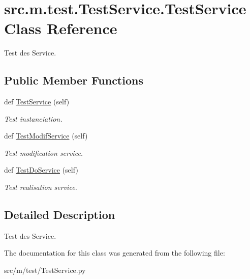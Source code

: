 \hypertarget{classsrc_1_1m_1_1test_1_1_test_service_1_1_test_service}{}\section{src.\+m.\+test.\+Test\+Service.\+Test\+Service Class Reference}
\label{classsrc_1_1m_1_1test_1_1_test_service_1_1_test_service}


Test des Service.  


\subsection*{Public Member Functions}
\begin{DoxyCompactItemize}
\item 
\hypertarget{classsrc_1_1m_1_1test_1_1_test_service_1_1_test_service_add84ee3b8efb0d31a2f31dae646a063f}{}def \hyperlink{classsrc_1_1m_1_1test_1_1_test_service_1_1_test_service_add84ee3b8efb0d31a2f31dae646a063f}{Test\+Service} (self)\label{classsrc_1_1m_1_1test_1_1_test_service_1_1_test_service_add84ee3b8efb0d31a2f31dae646a063f}

\begin{DoxyCompactList}\small\item\em Test instanciation. \end{DoxyCompactList}\item 
\hypertarget{classsrc_1_1m_1_1test_1_1_test_service_1_1_test_service_abd0da6c409b14d25eb39e0ac8d54985f}{}def \hyperlink{classsrc_1_1m_1_1test_1_1_test_service_1_1_test_service_abd0da6c409b14d25eb39e0ac8d54985f}{Test\+Modif\+Service} (self)\label{classsrc_1_1m_1_1test_1_1_test_service_1_1_test_service_abd0da6c409b14d25eb39e0ac8d54985f}

\begin{DoxyCompactList}\small\item\em Test modification service. \end{DoxyCompactList}\item 
\hypertarget{classsrc_1_1m_1_1test_1_1_test_service_1_1_test_service_a946cbc1bbbc1e49842dee9b0fe4cad36}{}def \hyperlink{classsrc_1_1m_1_1test_1_1_test_service_1_1_test_service_a946cbc1bbbc1e49842dee9b0fe4cad36}{Test\+Do\+Service} (self)\label{classsrc_1_1m_1_1test_1_1_test_service_1_1_test_service_a946cbc1bbbc1e49842dee9b0fe4cad36}

\begin{DoxyCompactList}\small\item\em Test realisation service. \end{DoxyCompactList}\end{DoxyCompactItemize}


\subsection{Detailed Description}
Test des Service. 

The documentation for this class was generated from the following file\+:\begin{DoxyCompactItemize}
\item 
src/m/test/Test\+Service.\+py\end{DoxyCompactItemize}
